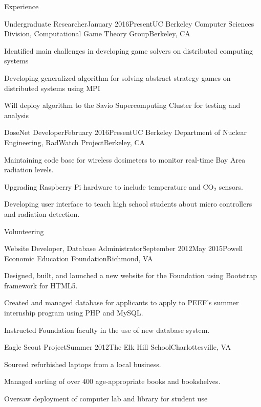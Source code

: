 \documentclass{resume} %
\begin{document}
\begin{rSection}{Experience}
\begin{rSubsection}{Undergraduate Researcher}{January 2016\textminus Present}{UC Berkeley Computer Sciences Division, Computational Game Theory Group}{Berkeley, CA}
\item Identified main challenges in developing game solvers on distributed computing systems
\item Developing generalized algorithm for solving abstract strategy games on distributed systems using MPI
\item Will deploy algorithm to the Savio Supercomputing Cluster for testing and analysis
\end{rSubsection}
\begin{rSubsection}{DoseNet Developer}{February 2016\textminus Present}{UC Berkeley Department of Nuclear Engineering, RadWatch Project}{Berkeley, CA}
\item Maintaining code base for wireless dosimeters to monitor real-time Bay Area radiation levels.
\item Upgrading Raspberry Pi hardware to include temperature and CO$_2$ sensors. 
\item Developing user interface to teach high school students about micro controllers and radiation detection.
\end{rSubsection}
\end{rSection}


\begin{rSection}{Volunteering}

\begin{rSubsection}{Website Developer, Database Administrator}{September 2012\textminus May 2015}{Powell Economic Education Foundation}{Richmond, VA}
\item Designed, built, and launched a new website for the Foundation using Bootstrap framework for HTML5.
\item Created and managed database for applicants to apply to PEEF's summer internship program using PHP and MySQL.
\item Instructed Foundation faculty in the use of new database system.
\end{rSubsection}
\begin{rSubsection}{Eagle Scout Project}{Summer 2012}{The Elk Hill School}{Charlottesville, VA}
\item Sourced refurbished laptops from a local business.
\item Managed sorting of over 400 age-appropriate books and bookshelves.
\item Oversaw deployment of computer lab and library for student use
\end{rSubsection}
\end{rSection}
\end{document}
